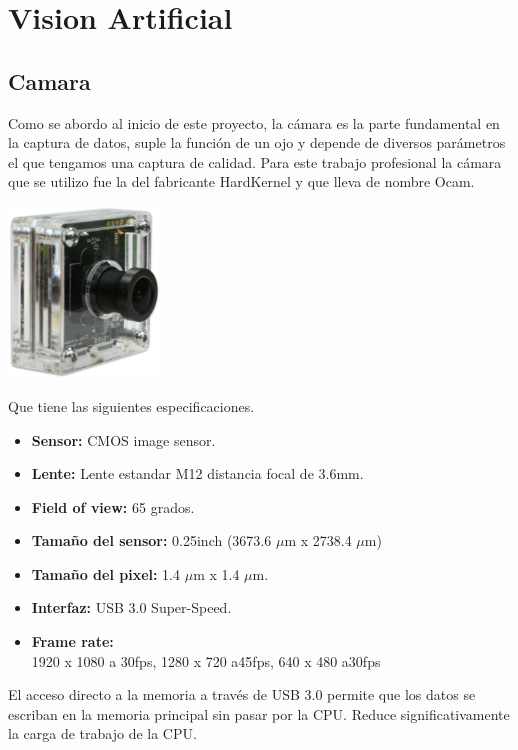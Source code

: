\chapter{Vision Artificial}

\section{Camara}
Como se abordo al inicio de este proyecto, la cámara es la parte fundamental en
la captura de datos, suple la función de un ojo y depende de diversos
parámetros el que tengamos una captura de calidad. Para este trabajo profesional
la cámara que se utilizo fue la del fabricante HardKernel y que lleva de nombre
Ocam.
\begin{center}
	\includegraphics[width=0.3\textwidth]{Contenido/Cuerpo/Capitulo4/Fig0_1.eps}
	\label{Fig1}
\end{center}
Que tiene las siguientes especificaciones.
\begin{itemize}
	\item \textbf{Sensor:} CMOS image sensor.
	\item \textbf{Lente: } Lente estandar M12 distancia focal de 3.6mm.
	\item \textbf{Field of view: } 65 grados.
	\item \textbf{Tamaño del sensor: }0.25inch (3673.6 $\mu$m x 2738.4 $\mu$m)
	\item \textbf{Tamaño del pixel: } 1.4 $\mu$m x 1.4 $\mu$m.
	\item \textbf{Interfaz: }USB 3.0 Super-Speed.
	\item \textbf{Frame rate: }\\
	      1920 x 1080 a 30fps, 1280 x 720 a45fps, 640 x 480 a30fps
\end{itemize}
El acceso directo a la memoria a través de USB 3.0 permite que los datos se
escriban en la memoria principal sin pasar por la CPU. Reduce significativamente
la carga de trabajo de la CPU.

